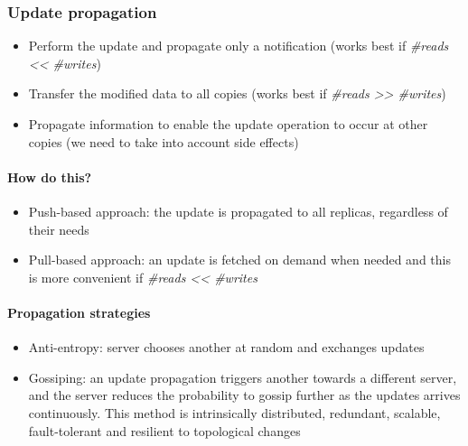 \subsubsection{Update propagation}\label{update-propagation}

\begin{itemize}
    \itemsep1pt\parskip0pt
    \item
      Perform the update and propagate only a notification (works best if
      \emph{\#reads \textless{}\textless{} \#writes})
    \item
      Transfer the modified data to all copies (works best if \emph{\#reads
      \textgreater{}\textgreater{} \#writes})
    \item
      Propagate information to enable the update operation to occur at other
      copies (we need to take into account side effects)
\end{itemize}

\paragraph{How do this?}\label{how-do-this}

\begin{itemize}
    \itemsep1pt\parskip0pt
    \item
      Push-based approach: the update is propagated to all replicas,
      regardless of their needs
    \item
      Pull-based approach: an update is fetched on demand when needed and
      this is more convenient if \emph{\#reads \textless{}\textless{}
      \#writes}
\end{itemize}

\paragraph{Propagation strategies}\label{propagation-strategies}

\begin{itemize}
    \itemsep1pt\parskip0pt
    \item
      Anti-entropy: server chooses another at random and exchanges updates
    \item
      Gossiping: an update propagation triggers another towards a different
      server, and the server reduces the probability to gossip further as
      the updates arrives continuously. This method is intrinsically distributed, 
      redundant, scalable, fault-tolerant and resilient to topological changes
\end{itemize}